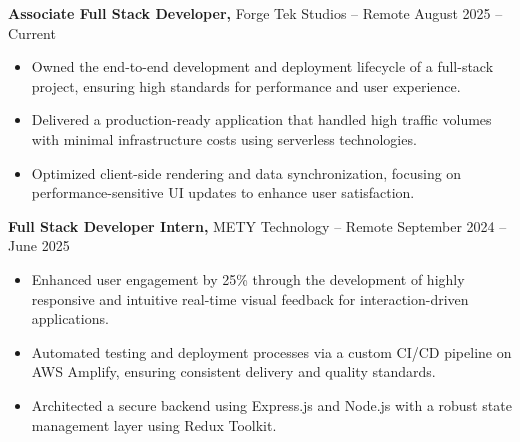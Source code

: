 \documentclass[11pt]{article}       %
\begin{document}
\textbf{Associate Full Stack Developer,} {Forge Tek Studios} -- Remote \hfill August 2025 -- Current 
\vspace{-9pt}
\begin{itemize}
  \item Owned the end-to-end development and deployment lifecycle of a full-stack project, ensuring high standards for performance and user experience.
  \item Delivered a production-ready application that handled high traffic volumes with minimal infrastructure costs using serverless technologies.
  \item Optimized client-side rendering and data synchronization, focusing on performance-sensitive UI updates to enhance user satisfaction.
\end{itemize}

\textbf{Full Stack Developer Intern,} {METY Technology} -- Remote \hfill September 2024 -- June 2025 
\vspace{-9pt}
\begin{itemize}
  \item Enhanced user engagement by 25\% through the development of highly responsive and intuitive real-time visual feedback for interaction-driven applications.
  \item Automated testing and deployment processes via a custom CI/CD pipeline on AWS Amplify, ensuring consistent delivery and quality standards.
  \item Architected a secure backend using Express.js and Node.js with a robust state management layer using Redux Toolkit.
\end{itemize}

\vspace{-18.5pt}
\end{document}

